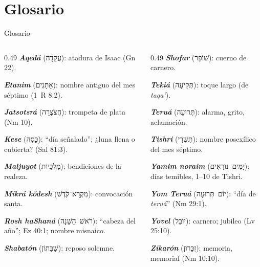 \documentclass[hyperref={bookmarks=false},aspectratio=169]{beamer}
\newcommand{\heb}[1]{\mbox{\foreignlanguage{hebrew}{#1}}}
\begin{document}
\section{Glosario}

\begin{frame}{Glosario}
\scriptsize\RaggedRight
\begin{columns}[t,onlytextwidth]
\begin{column}{0.49\textwidth}
\textbf{\emph{Aqedá}} (\heb{עֲקֵדָה}): atadura de Isaac (Gn 22).\par
\textbf{\emph{Etanim}} (\heb{אֵתָנִים}): nombre antiguo del mes séptimo (1~R 8:2).\par
\textbf{\emph{Jatsotsrá}} (\heb{חֲצֹצְרָה}): trompeta de plata (Nm 10).\par
\textbf{\emph{Kese}} (\heb{כֵּסֶה}): ``día señalado''; ¿luna llena o cubierta? (Sal 81:3).\par
\textbf{\emph{Maljuyot}} (\heb{מַלְכֻיּוֹת}): bendiciones de la realeza.\par
\textbf{\emph{Mikrá kódesh}} (\heb{מִקְרָא־קֹדֶשׁ}): convocación santa.\par
\textbf{\emph{Rosh haShaná}} (\heb{רֹאשׁ הַשָּׁנָה}): ``cabeza del año''; Ez 40:1; nombre misnaico.\par
\textbf{\emph{Shabatón}} (\heb{שַׁבָּתוֹן}): reposo solemne.
\end{column}
\begin{column}{0.49\textwidth}
\textbf{\emph{Shofar}} (\heb{שׁוֹפָר}): cuerno de carnero.\par
\textbf{\emph{Tekiá}} (\heb{תְּקִיעָה}): toque largo (de \emph{taqa'}).\par
\textbf{\emph{Teruá}} (\heb{תְּרוּעָה}): alarma, grito, aclamación.\par
\textbf{\emph{Tishri}} (\heb{תִּשְׁרִי}): nombre posexílico del mes séptimo.\par
\textbf{\emph{Yamim noraim}} (\heb{יָמִים נוֹרָאִים}): días temibles, 1--10 de Tishri.\par
\textbf{\emph{Yom Teruá}} (\heb{יוֹם תְּרוּעָה}): ``día de \emph{teruá}'' (Nm 29:1).\par
\textbf{\emph{Yovel}} (\heb{יוֹבֵל}): carnero; jubileo (Lv 25:10).\par
\textbf{\emph{Zikarón}} (\heb{זִכָּרוֹן}): memoria, memorial (Nm 10:10).
\end{column}
\end{columns}
\end{frame}
\end{document}
